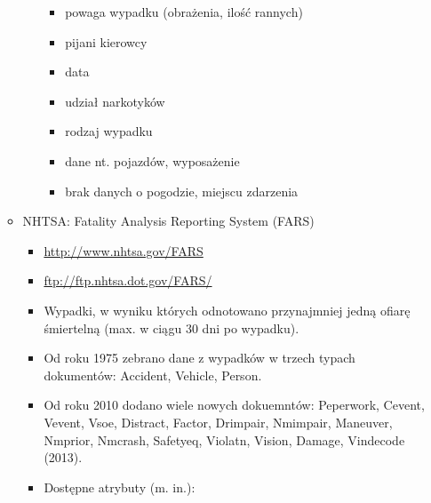 \begin{enumerate}
\begin{itemize}
\begin{itemize}
      \begin{itemize}
      \itemsep-14pt\parskip0pt
      \item
        powaga wypadku (obrażenia, ilość rannych)\\
      \item
        pijani kierowcy\\
      \item
        data\\
      \item
        udział narkotyków\\
      \item
        rodzaj wypadku\\
      \item
        dane nt. pojazdów, wyposażenie\\
      \item
        brak danych o pogodzie, miejscu zdarzenia\\
      \end{itemize}
    \end{itemize}
  \item
    NHTSA: Fatality Analysis Reporting System (FARS)

    \begin{itemize}
    \item
      \url{http://www.nhtsa.gov/FARS}\\
    \item
      \url{ftp://ftp.nhtsa.dot.gov/FARS/}\\
    \item
      Wypadki, w wyniku których odnotowano przynajmniej jedną ofiarę
      śmiertelną (max. w ciągu 30 dni po wypadku).\\
    \item
      Od roku 1975 zebrano dane z wypadków w trzech typach dokumentów:
      Accident, Vehicle, Person.\\
    \item
      Od roku 2010 dodano wiele nowych dokuemntów: Peperwork, Cevent,
      Vevent, Vsoe, Distract, Factor, Drimpair, Nmimpair, Maneuver,
      Nmprior, Nmcrash, Safetyeq, Violatn, Vision, Damage, Vindecode
      (2013).\\
    \item
      Dostępne atrybuty (m. in.):


\end{itemize}
\end{itemize}
\end{enumerate}
